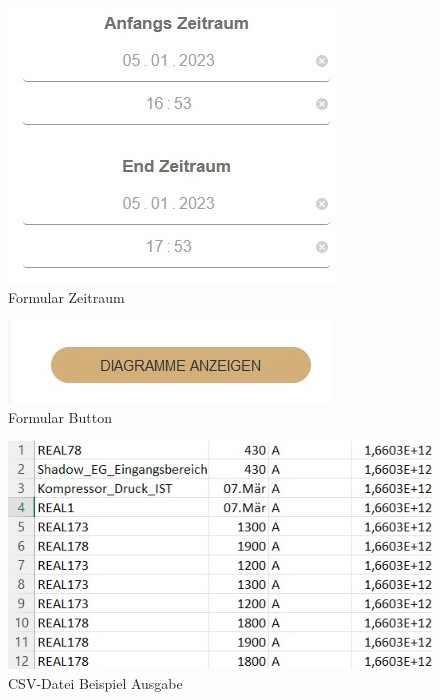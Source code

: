 \begin{figure}
    \centering
    \includegraphics[scale=1]{pics/FlexLoggerWebsiteFormulare_zeitraum.jpg}
    \caption{Formular Zeitraum}
    \label{fig:impl:FlexLoggerHauptseitenAnsichtZeitraum}
\end{figure}

\begin{figure}
    \centering
    \includegraphics[scale=1]{pics/FlexLoggerWebsiteFormulare_button.jpg}
    \caption{Formular Button}
    \label{fig:impl:FlexLoggerHauptseitenAnsichtButton}
\end{figure}

\begin{figure}
    \centering
    \includegraphics[scale=1]{pics/csv_datei_beispiel.jpg}
    \caption{CSV-Datei Beispiel Ausgabe}
    \label{fig:impl:FlexLoggerHauptseitenAnsichtCSV}
\end{figure}

